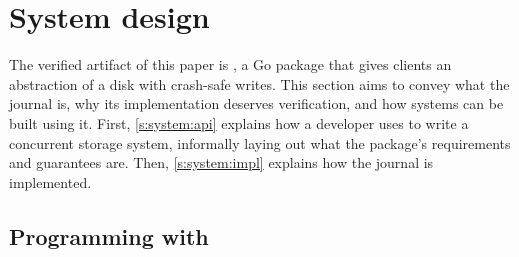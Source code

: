 \section{System design}
\label{s:system}

The verified artifact of this paper is \txn, a Go package that gives clients an
abstraction of a disk with crash-safe writes. This section aims to convey what
the journal is, why its implementation deserves verification, and how systems can be built
using it. First, \autoref{s:system:api} explains how a developer uses
\txn to write a concurrent storage system, informally laying out what the
package's requirements and guarantees are. Then,
\autoref{s:system:impl} explains how the journal is implemented.



\subsection{Programming with \txn}
\label{s:system:api}

